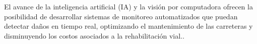 	El avance de la inteligencia artificial (IA) y la visión por computadora ofrecen la posibilidad de desarrollar sistemas de monitoreo automatizados que puedan detectar daños en tiempo real, optimizando el mantenimiento de las carreteras y disminuyendo los costos asociados a la rehabilitación vial.\parencite{pr_haugen2016amethy}.


